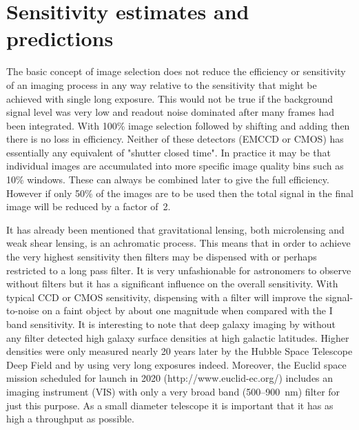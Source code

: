 \documentclass{pasa}%
\begin{document}
 \section{Sensitivity estimates and predictions}
 \label{Sect:sensitive}
 The basic concept of image selection does not reduce the efficiency or sensitivity of an imaging process in any way relative to the sensitivity that might be achieved with single long exposure.  This would not be true if the background signal level was very low and readout noise dominated after many frames had been integrated.  With 100\% image selection followed by shifting and adding then there is no loss in efficiency.  Neither of these detectors (EMCCD or CMOS) has essentially any equivalent of "shutter closed time".  In practice it may be that individual images are accumulated into more specific image quality bins such as 10\% windows.  These can always be combined later to give the full efficiency.  However if only 50\% of the images are to be used then the total signal in the final image will be reduced by a factor of~2.
 
 It has already been mentioned that gravitational lensing, both microlensing and weak shear lensing, is an achromatic process.  This means that in order to achieve the very highest sensitivity then filters may be dispensed with or perhaps restricted to a long pass filter.  It is very unfashionable for astronomers to observe without filters but it has a significant influence on the overall sensitivity.  With typical CCD or CMOS sensitivity, dispensing with a filter will improve the signal-to-noise on a faint object by about one magnitude when compared with the I band sensitivity.  It is interesting to note that deep galaxy imaging by \citet{HalMac1984} without any filter detected high galaxy surface densities at high galactic latitudes.  Higher densities were only measured nearly 20 years later by the Hubble Space Telescope Deep Field and by using very long exposures indeed.  Moreover, the Euclid space mission scheduled for launch in 2020 (http://www.euclid-ec.org/)  includes an imaging instrument (VIS) with only a very broad band (500--900~nm) filter for just this purpose.  As a small diameter telescope it is important that it has as high a throughput as possible.
 
 
\end{document}
